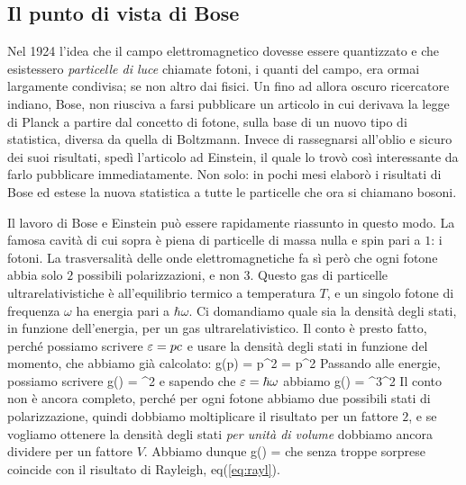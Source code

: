 \subsection{Il punto di vista di Bose}
Nel 1924 l'idea che il campo elettromagnetico dovesse essere quantizzato e che esistessero {\em particelle di luce} chiamate fotoni, i quanti del campo, era ormai largamente condivisa; se non altro dai fisici. Un fino ad allora oscuro ricercatore indiano, Bose, non riusciva a farsi pubblicare un articolo in cui derivava la legge di Planck a partire dal concetto di fotone, sulla base di un nuovo tipo di statistica, diversa da quella di Boltzmann. Invece di rassegnarsi all'oblio e sicuro dei suoi risultati, spedì l'articolo ad Einstein, il quale lo trovò così interessante da farlo pubblicare immediatamente. Non solo: in pochi mesi elaborò i risultati di Bose ed estese la nuova statistica a tutte le particelle che ora si chiamano bosoni.

Il lavoro di Bose e Einstein può essere rapidamente riassunto in questo modo. La famosa cavità di cui sopra è piena di particelle di massa nulla e spin pari a $1$: i fotoni. La trasversalità delle onde elettromagnetiche fa sì però che ogni fotone abbia solo $2$ possibili polarizzazioni, e non $3$. Questo gas di particelle ultrarelativistiche è all'equilibrio termico a temperatura $T$, e un singolo fotone di frequenza $\omega$ ha energia pari a $\hbar\omega$. Ci domandiamo quale sia la densità degli stati, in funzione dell'energia, per un gas ultrarelativistico. Il conto è presto fatto, perché possiamo scrivere $\varepsilon = pc$ e usare la densità degli stati in funzione del momento, che abbiamo già calcolato:
\be
g(p) =  p^2 =  p^2
\ee
Passando alle energie, possiamo scrivere
\be
g(\eps)\de{\eps} =  \eps^2\de{\eps}
\ee
e sapendo che $\varepsilon = \hbar\omega$ abbiamo
\be
g(\omega)\de{\omega} =  \hbar^3\omega^2\de{\omega}
\ee
Il conto non è ancora completo, perché per ogni fotone abbiamo due possibili stati di polarizzazione, quindi dobbiamo moltiplicare il risultato per un fattore $2$, e se vogliamo ottenere la densità degli stati {\em per unità di volume} dobbiamo ancora dividere per un fattore $V$. Abbiamo dunque
\be
\label{eq:gomega}
g(\omega)\de{\omega} = \de{\omega}
\ee
che senza troppe sorprese coincide con il risultato di Rayleigh, eq(\ref{eq:rayl}).

